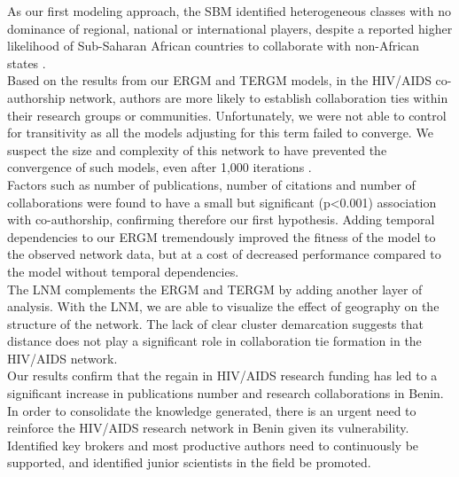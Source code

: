 As our first modeling approach, the SBM identified heterogeneous classes with no dominance of regional, national or international players, despite a reported higher likelihood of Sub-Saharan African countries to collaborate with non-African states \cite{onyancha_knowledge_2011}.\\
Based on the results from our ERGM and TERGM models, in the HIV/AIDS co-authorship network, authors are more likely to establish collaboration ties within their research groups or communities. Unfortunately, we were not able to control for transitivity as all the models adjusting for this term failed to converge. We suspect the size and complexity of this network to have prevented the convergence of such models, even after 1,000 iterations \cite{schmid_exponential_2017}. \\ 
Factors such as number of publications, number of citations and number of collaborations were found to have a small but significant (p<0.001) association with co-authorship, confirming therefore our first hypothesis. Adding temporal dependencies to our ERGM tremendously improved the fitness of the model to the observed network data, but at a cost of decreased performance compared to the model without temporal dependencies.\\
The LNM complements the ERGM and TERGM by adding another layer of analysis. With the LNM, we are able to visualize the effect of geography on the structure of the network. The lack of clear cluster demarcation suggests that distance does not play a significant role in collaboration tie formation in the HIV/AIDS network. \\
Our results confirm that the regain in HIV/AIDS research funding has led to a significant increase in publications number and research collaborations in Benin. In order to consolidate the knowledge generated, there is an urgent need to reinforce the HIV/AIDS research network in Benin given its vulnerability. Identified key brokers and most productive authors need to continuously be supported, and identified junior scientists in the field be promoted.
